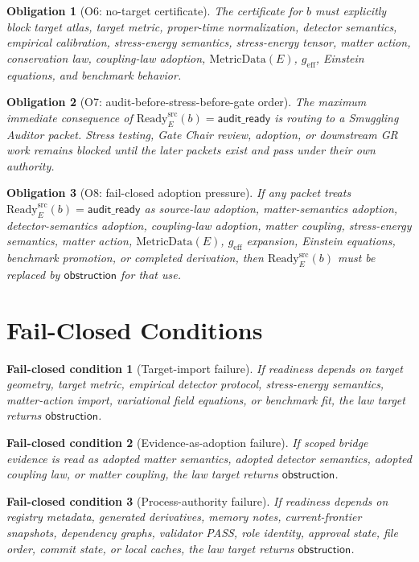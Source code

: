\documentclass[11pt]{article}
\newcommand{\Ready}{\mathrm{Ready}^{\mathrm{src}}_E}
\newcommand{\AuditReady}{\mathsf{audit\_ready}}
\newcommand{\Obstruction}{\mathsf{obstruction}}
\newcommand{\MetricData}{\mathrm{MetricData}}
\newcommand{\geff}{g_{\mathrm{eff}}}
\newtheorem{obligation}{Obligation}
\newtheorem{failure}{Fail-closed condition}
\begin{document}
\begin{obligation}[O6: no-target certificate]
The certificate for \(b\) must explicitly block target atlas, target metric,
proper-time normalization, detector semantics, empirical calibration,
stress-energy semantics, stress-energy tensor, matter action, conservation
law, coupling-law adoption, \(\MetricData(E)\), \(\geff\), Einstein equations,
and benchmark behavior.
\end{obligation}

\begin{obligation}[O7: audit-before-stress-before-gate order]
The maximum immediate consequence of \(\Ready(b)=\AuditReady\) is routing to a
Smuggling Auditor packet. Stress testing, Gate Chair review, adoption, or
downstream GR work remains blocked until the later packets exist and pass
under their own authority.
\end{obligation}

\begin{obligation}[O8: fail-closed adoption pressure]
If any packet treats \(\Ready(b)=\AuditReady\) as source-law adoption,
matter-semantics adoption, detector-semantics adoption, coupling-law
adoption, matter coupling, stress-energy semantics, matter action,
\(\MetricData(E)\), \(\geff\) expansion, Einstein equations, benchmark
promotion, or completed derivation, then \(\Ready(b)\) must be replaced by
\(\Obstruction\) for that use.
\end{obligation}

\section{Fail-Closed Conditions}

\begin{failure}[Target-import failure]
If readiness depends on target geometry, target metric, empirical detector
protocol, stress-energy semantics, matter-action import, variational field
equations, or benchmark fit, the law target returns \(\Obstruction\).
\end{failure}

\begin{failure}[Evidence-as-adoption failure]
If scoped bridge evidence is read as adopted matter semantics, adopted
detector semantics, adopted coupling law, or matter coupling, the law target
returns \(\Obstruction\).
\end{failure}

\begin{failure}[Process-authority failure]
If readiness depends on registry metadata, generated derivatives, memory
notes, current-frontier snapshots, dependency graphs, validator PASS, role
identity, approval state, file order, commit state, or local caches, the law
target returns \(\Obstruction\).
\end{failure}
\end{document}
